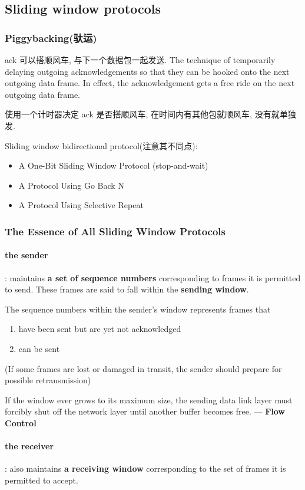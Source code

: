 \subsection{Sliding window protocols}
\subsubsection{Piggybacking(驮运)}
ack 可以搭顺风车, 与下一个数据包一起发送. The technique of temporarily delaying outgoing acknowledgements so that they can be hooked onto the next outgoing data frame. In effect, the acknowledgement gets a free ride on the next outgoing data frame.

使用一个计时器决定 ack 是否搭顺风车, 在时间内有其他包就顺风车, 没有就单独发. 

Sliding window bidirectional protocol(注意其不同点): 
\begin{itemize}
    \item A One-Bit Sliding Window Protocol (stop-and-wait)
    \item A Protocol Using Go Back N
    \item A Protocol Using Selective Repeat
\end{itemize}

\subsubsection{The Essence of All Sliding Window Protocols}
\paragraph{the sender}: maintains \textbf{a set of sequence numbers} corresponding to frames it is permitted to send. These frames are said to fall within the \textbf{sending window}.

The sequence numbers within the sender's window represents frames that 
\begin{enumerate}
    \item have been sent but are yet not acknowledged 
    \item can be sent
\end{enumerate}
(If some frames are lost or damaged in transit, the sender should prepare for possible retransmission)

If the window ever grows to its maximum size, the sending data link layer must forcibly shut off the network layer until another buffer becomes free.  --- \textbf{Flow Control}

\paragraph{the receiver}: also maintains \textbf{a receiving window} corresponding to the set of frames it is permitted to accept.

